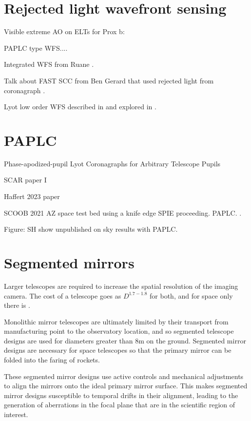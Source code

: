 \documentclass[letterpaper]{ar-1col}
\begin{document}
\lipsum[2-4]

\section{Rejected light wavefront sensing} 

Visible extreme AO on ELTs for Prox b: \citep{Fowler23}

PAPLC type WFS....

Integrated WFS from Ruane \citep{Ruane20}.

Talk about FAST SCC from Ben Gerard that used rejected light from coronagraph \citep{Gerard18}.


Lyot low order WFS described in \citet{Guyon09} and explored in \citet{Singh14,Singh15}.


\lipsum[2-4]

\section{PAPLC}
Phase-apodized-pupil Lyot Coronagraphs for Arbitrary Telescope Pupils \citep{Por20}

SCAR paper I \citep{Por20a}

Haffert 2023 paper

SCOOB 2021 AZ space test bed \citep{Ashcraft22} using a knife edge SPIE proceeding. PAPLC. \citep{vanGorkom22}.

Figure: SH show unpublished on sky results with PAPLC.

\section{Segmented mirrors}

Larger telescopes are required to increase the spatial resolution of the imaging camera. The cost of a telescope goes as $D^{1.7-1.8}$ \citep{Stahl20} for both, and for space only there is \citet{Stahl10}.
 
Monolithic mirror telescopes are ultimately limited by their transport from manufacturing point to the observatory location, and so segmented telescope designs are used for diameters greater than 8m on the ground.
 Segmented mirror designs are necessary for space telescopes so that the primary mirror can be folded into the faring of rockets.

These segmented mirror designs use active controls and mechanical adjustments to align the mirrors onto the ideal primary mirror surface.
%
This makes segmented mirror designs susceptible to temporal drifts in their alignment, leading to the generation of aberrations in the focal plane that are in the scientific region of interest.
\end{document}
